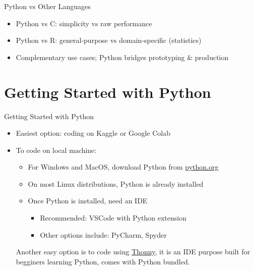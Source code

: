 \documentclass[12pt, aspectratio=169]{beamer}
\begin{document}
    \begin{frame}{Python vs Other Languages}
        \begin{itemize}
            \item Python vs C: simplicity vs raw performance
            \item Python vs R: general-purpose vs domain-specific (statistics)
            \item Complementary use cases; Python bridges prototyping \& production
        \end{itemize}
    \end{frame}


    \section{Getting Started with Python}

    \begin{frame}{Getting Started with Python}
        \begin{itemize}
            \item Easiest option: coding on Kaggle or Google Colab
            \item To code on local machine:
            \begin{itemize}
                \item For Windows and MacOS, download Python from \href{https://www.python.org/}{python.org}
                \item On most Linux distributions, Python is already installed
                \item Once Python is installed, need an IDE
                \begin{itemize}
                    \item Recommended: VSCode with Python extension
                    \item Other options include: PyCharm, Spyder
                \end{itemize}
            \end{itemize}

            Another easy option is to code using \href{https://thonny.org/}{Thonny}, it is an IDE purpose built for begginers learning Python, comes with Python bundled.
        \end{itemize}
    \end{frame}
\end{document}
